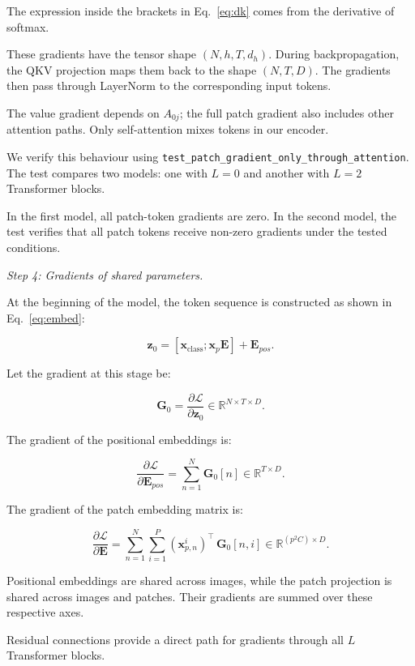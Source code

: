 \documentclass{article}
\begin{document}
The expression inside the brackets in Eq.~\ref{eq:dk}
comes from the derivative of softmax.

These gradients have the tensor shape $(N,h,T,d_h)$.
During backpropagation, the QKV projection maps them back
to the shape $(N,T,D)$. The gradients then pass through
LayerNorm to the corresponding input tokens.

The value gradient depends on $A_{0j}$; the full patch gradient also includes other attention paths. Only self-attention mixes tokens in our encoder.

We verify this behaviour using
\texttt{test\_patch\_gradient\_only\_through\_attention}.
The test compares two models: one with $L=0$ and another
with $L=2$ Transformer blocks.

In the first model, all patch-token gradients are zero.
In the second model, the test verifies that all patch
tokens receive non-zero gradients under the tested conditions.

\emph{Step 4: Gradients of shared parameters.}

At the beginning of the model, the token sequence is
constructed as shown in Eq.~\ref{eq:embed}:

\[
\mathbf{z}_0 =
[\mathbf{x}_{\text{class}};\mathbf{x}_p\mathbf{E}]
+ \mathbf{E}_{pos}.
\]

Let the gradient at this stage be:

\[
\mathbf{G}_0 =
\frac{\partial\mathcal{L}}{\partial\mathbf{z}_0}
\in\mathbb{R}^{N\times T\times D}.
\]

The gradient of the positional embeddings is:

\begin{equation}
\frac{\partial\mathcal{L}}{\partial\mathbf{E}_{pos}}
=
\sum_{n=1}^{N}\mathbf{G}_0[n]
\in\mathbb{R}^{T\times D}.
\end{equation}

The gradient of the patch embedding matrix is:

\begin{equation}
\frac{\partial\mathcal{L}}{\partial\mathbf{E}}
=
\sum_{n=1}^{N}\sum_{i=1}^{P}
(\mathbf{x}_{p,n}^{i})^{\top}\,
\mathbf{G}_0[n,i]
\in\mathbb{R}^{(p^2C)\times D}.
\end{equation}

Positional embeddings are shared across images, while the patch projection is shared across images and patches. Their gradients are summed over these respective axes.

Residual connections provide a direct path for gradients
through all $L$ Transformer blocks.
\end{document}
